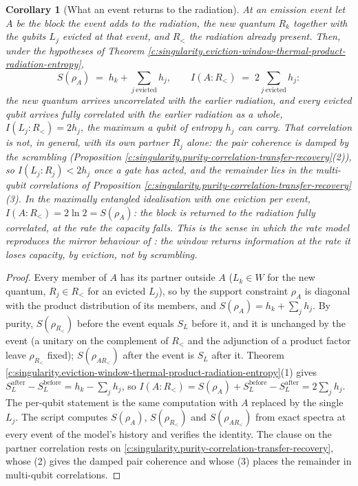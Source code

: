 \documentclass[11pt]{article}
\newtheorem{corollary}[theorem]{Corollary}
\theoremstyle{definition}
\theoremstyle{plain}
\newcommand{\changedmark}[2]{\marginpar{\raggedright\scriptsize\color{#1}#2}}
\begin{document}
\begin{corollary}[What an event returns to the radiation]\label{c:singularity.what-event-returns-radiation}
\changedmark{gray}{reworded}
At an emission event let $A$ be the block the event adds to the radiation, the new quantum $R_k$ together with the qubits $L_j$ evicted at that event, and $R_{<}$ the radiation already present. Then, under the hypotheses of Theorem \ref{c:singularity.eviction-window-thermal-product-radiation-entropy},
\[
S(\rho_A) \;=\; h_k + \sum_{j\ \mathrm{evicted}} h_j , \qquad I(A{:}R_{<}) \;=\; 2\sum_{j\ \mathrm{evicted}} h_j :
\]
the new quantum arrives uncorrelated with the earlier radiation, and every evicted qubit arrives fully correlated with the earlier radiation as a whole, $I(L_j{:}R_{<}) = 2h_j$, the maximum a qubit of entropy $h_j$ can carry. That correlation is not, in general, with its own partner $R_j$ alone: the pair coherence is damped by the scrambling (Proposition \ref{c:singularity.purity-correlation-transfer-recovery}(2)), so $I(L_j{:}R_j) < 2h_j$ once a gate has acted, and the remainder lies in the multi-qubit correlations of Proposition \ref{c:singularity.purity-correlation-transfer-recovery}(3). In the maximally entangled idealisation with one eviction per event, $I(A{:}R_{<}) = 2\ln 2 = S(\rho_A)$: the block is returned to the radiation fully correlated, at the rate the capacity falls. This is the sense in which the rate model reproduces the mirror behaviour of \cite{HP2007}: the window returns information at the rate it loses capacity, by eviction, not by scrambling.
\end{corollary}
\begin{proof}
Every member of $A$ has its partner outside $A$ ($L_k \in W$ for the new quantum, $R_j \in R_{<}$ for an evicted $L_j$), so by the support constraint $\rho_A$ is diagonal with the product distribution of its members, and $S(\rho_A) = h_k + \sum_j h_j$. By purity, $S(\rho_{R_<})$ before the event equals $S_L$ before it, and it is unchanged by the event (a unitary on the complement of $R_<$ and the adjunction of a product factor leave $\rho_{R_<}$ fixed); $S(\rho_{AR_<})$ after the event is $S_L$ after it. Theorem \ref{c:singularity.eviction-window-thermal-product-radiation-entropy}(1) gives $S_L^{\mathrm{after}} - S_L^{\mathrm{before}} = h_k - \sum_j h_j$, so $I(A{:}R_<) = S(\rho_A) + S_L^{\mathrm{before}} - S_L^{\mathrm{after}} = 2\sum_j h_j$. The per-qubit statement is the same computation with $A$ replaced by the single $L_j$. The script computes $S(\rho_A)$, $S(\rho_{R_<})$ and $S(\rho_{AR_<})$ from exact spectra at every event of the model's history and verifies the identity. The clause on the partner correlation rests on \ref{c:singularity.purity-correlation-transfer-recovery}, whose (2) gives the damped pair coherence and whose (3) places the remainder in multi-qubit correlations.

\end{proof}
\end{document}
